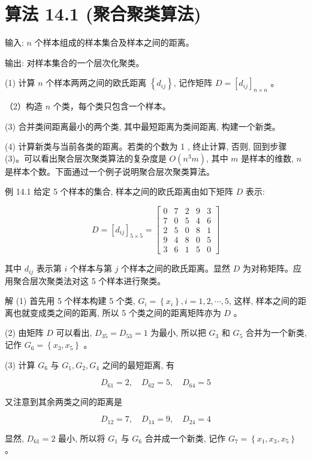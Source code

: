 \documentclass[10pt]{article}
\begin{document}
\section*{算法 14.1 (聚合聚类算法)}
输入: $n$ 个样本组成的样本集合及样本之间的距离。

输出: 对样本集合的一个层次化聚类。

(1) 计算 $n$ 个样本两两之间的欧氏距离 $\left\{d_{i j}\right\}$, 记作矩阵 $D=\left[d_{i j}\right]_{n \times n}$ 。

（2）构造 $n$ 个类，每个类只包含一个样本。

(3) 合并类间距离最小的两个类, 其中最短距离为类间距离, 构建一个新类。

(4) 计算新类与当前各类的距离。若类的个数为 1 , 终止计算, 否则, 回到步骤 (3)。可以看出聚合层次聚类算法的复杂度是 $O\left(n^{3} m\right)$, 其中 $m$ 是样本的维数, $n$ 是样本个数。下面通过一个例子说明聚合层次聚类算法。

例 14.1 给定 5 个样本的集合, 样本之间的欧氏距离由如下矩阵 $D$ 表示:

$$
D=\left[d_{i j}\right]_{5 \times 5}=\left[\begin{array}{ccccc}
0 & 7 & 2 & 9 & 3 \\
7 & 0 & 5 & 4 & 6 \\
2 & 5 & 0 & 8 & 1 \\
9 & 4 & 8 & 0 & 5 \\
3 & 6 & 1 & 5 & 0
\end{array}\right]
$$

其中 $d_{i j}$ 表示第 $i$ 个样本与第 $j$ 个样本之间的欧氏距离。显然 $D$ 为对称矩阵。应用聚合层次聚类法对这 5 个样本进行聚类。

解 (1) 首先用 5 个样本构建 5 个类, $G_{i}=\left\{x_{i}\right\}, i=1,2, \cdots, 5$, 这样, 样本之间的距离也就变成类之间的距离, 所以 5 个类之间的距离矩阵亦为 $D$ 。

(2) 由矩阵 $D$ 可以看出, $D_{35}=D_{53}=1$ 为最小, 所以把 $G_{3}$ 和 $G_{5}$ 合并为一个新类, 记作 $G_{6}=\left\{x_{3}, x_{5}\right\}$ 。

(3) 计算 $G_{6}$ 与 $G_{1}, G_{2}, G_{4}$ 之间的最短距离, 有

$$
D_{61}=2, \quad D_{62}=5, \quad D_{64}=5
$$

又注意到其余两类之间的距离是

$$
D_{12}=7, \quad D_{14}=9, \quad D_{24}=4
$$

显然, $D_{61}=2$ 最小, 所以将 $G_{1}$ 与 $G_{6}$ 合并成一个新类, 记作 $G_{7}=\left\{x_{1}, x_{3}, x_{5}\right\}$ 。
\end{document}
